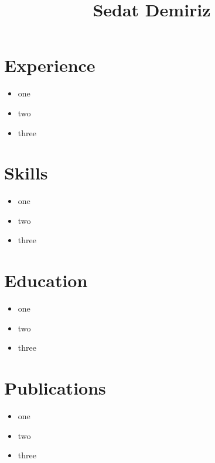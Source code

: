 \documentclass{article}
\title{Sedat Demiriz}
\begin{document}
  \maketitle

\section{Experience}
\begin{itemize}
  \item one
  \item two
  \item three
\end{itemize}

\section{Skills}
\begin{itemize}
  \item one
  \item two
  \item three
\end{itemize}

\section{Education}
\begin{itemize}
  \item one
  \item two
  \item three
\end{itemize}

\section{Publications}
\begin{itemize}
  \item one
  \item two
  \item three
\end{itemize}
\end{document}
